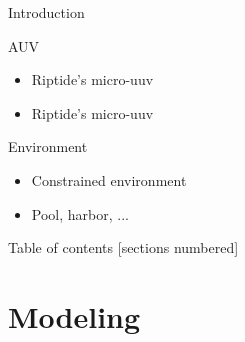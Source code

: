 \documentclass{beamer}
\begin{document}
        \begin{frame}{Introduction}
            \begin{minipage}{0.45\textwidth}
                \begin{block}{AUV}
                    \vspace{0.25cm}
                    \begin{itemize}
                        \item Riptide's micro-uuv \\ 
                        \item Riptide's micro-uuv
                    \end{itemize}
                \end{block}
                \begin{block}{Environment}
                    \begin{itemize}
                        \item Constrained environment \\ 
                        \item Pool, harbor, ...
                    \end{itemize}
                \end{block}
            \end{minipage}
            \hfill
            \begin{minipage}{0.45\textwidth}
                
            \end{minipage}
        \end{frame}

        \begin{frame}{Table of contents}
            [sections numbered]
            \tableofcontents[hideallsubsections]
          \end{frame}
    
    \section{Modeling}
\end{document}
